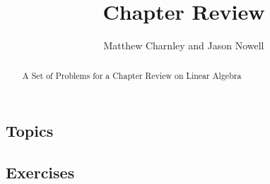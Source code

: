 \documentclass{ximera}
\title{Chapter Review}
\author{Matthew Charnley and Jason Nowell}
\begin{document}
\begin{abstract}
    A Set of Problems for a Chapter Review on Linear Algebra
\end{abstract}
\maketitle

\subsection{Topics}

\subsection{Exercises}
\end{document}
